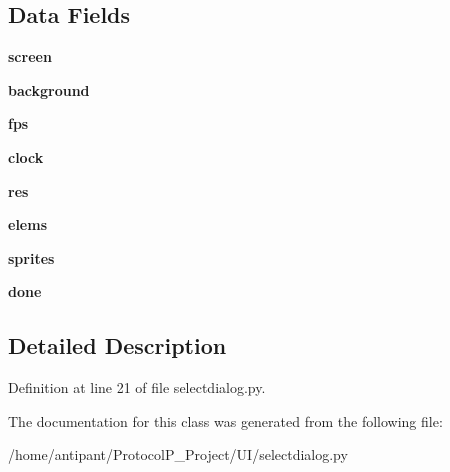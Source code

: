 \subsection*{Data Fields}
\begin{DoxyCompactItemize}
\item 
\hypertarget{classselectdialog_1_1Window_a4d154a9aad52ec0692243f5d7739be89}{{\bfseries screen}}\label{classselectdialog_1_1Window_a4d154a9aad52ec0692243f5d7739be89}

\item 
\hypertarget{classselectdialog_1_1Window_a951affeeac2b26a695a1dfcf84f314d2}{{\bfseries background}}\label{classselectdialog_1_1Window_a951affeeac2b26a695a1dfcf84f314d2}

\item 
\hypertarget{classselectdialog_1_1Window_a6d451cac38094e53e6689926b68c103d}{{\bfseries fps}}\label{classselectdialog_1_1Window_a6d451cac38094e53e6689926b68c103d}

\item 
\hypertarget{classselectdialog_1_1Window_a0570579a24621ecd5379ca938fa93b7e}{{\bfseries clock}}\label{classselectdialog_1_1Window_a0570579a24621ecd5379ca938fa93b7e}

\item 
\hypertarget{classselectdialog_1_1Window_a23eaef8cb0578292c0688a75a2618ebd}{{\bfseries res}}\label{classselectdialog_1_1Window_a23eaef8cb0578292c0688a75a2618ebd}

\item 
\hypertarget{classselectdialog_1_1Window_ac36daf62be1aff528d4833b9403d707f}{{\bfseries elems}}\label{classselectdialog_1_1Window_ac36daf62be1aff528d4833b9403d707f}

\item 
\hypertarget{classselectdialog_1_1Window_a1fd14a231e97c762f526771e35b75e05}{{\bfseries sprites}}\label{classselectdialog_1_1Window_a1fd14a231e97c762f526771e35b75e05}

\item 
\hypertarget{classselectdialog_1_1Window_a4ea42ee5e2971e051fea5c432df4d2f8}{{\bfseries done}}\label{classselectdialog_1_1Window_a4ea42ee5e2971e051fea5c432df4d2f8}

\end{DoxyCompactItemize}


\subsection{Detailed Description}


Definition at line 21 of file selectdialog.\-py.



The documentation for this class was generated from the following file\-:\begin{DoxyCompactItemize}
\item 
/home/antipant/\-Protocol\-P\-\_\-\-Project/\-U\-I/selectdialog.\-py\end{DoxyCompactItemize}
